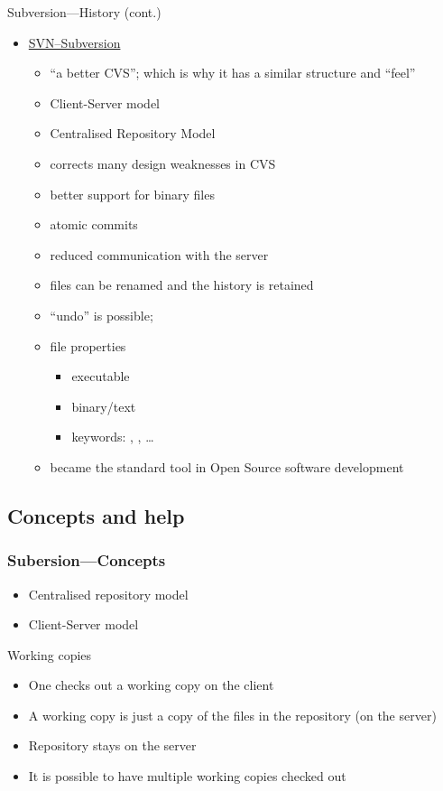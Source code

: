 \begin{frame}{Subversion---History (cont.)}
\begin{itemize}
\item \href{http://en.wikipedia.org/wiki/Apache_Subversion}{SVN--Subversion}
    \begin{itemize}
    \item \enquote{a better CVS}; which is why it has a similar structure
	and \enquote{feel}
    \item Client-Server model
    \item Centralised Repository Model
    \item corrects many design weaknesses in CVS
    \item better support for binary files
    \item atomic commits
    \item reduced communication with the server
    \item files can be renamed and the history is retained
    \item \enquote{undo} is possible; 
    \item file properties
        \begin{itemize}
        \item executable
        \item binary/text
        \item keywords: , ,
             \ldots
        \end{itemize}
    \item became the standard tool in Open Source software development
    \end{itemize}
\end{itemize}
\end{frame}

\subsection{Concepts and help}

\begin{frame}[fragile]
\frametitle{Subersion---Concepts}
\begin{itemize}
    \item Centralised repository model
    \item Client-Server model
\end{itemize}

{\large \alert{Working copies}}
\begin{itemize}
    \item One checks out a working copy on the client
    \item A working copy is just a copy of the files in the repository (on
	the server)
    \item Repository stays on the server
    \item It is possible to have multiple working copies checked out
\end{itemize}
\end{frame}

